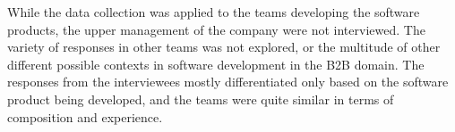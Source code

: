 \documentclass[english, grading]{tktltiki2}
\theoremstyle{definition}
\theoremstyle{remark}
\begin{document}
While the data collection was applied to the teams developing the software products, the upper management of the company were not interviewed. The variety of responses in other teams was not explored, or the multitude of other different possible contexts in software development in the B2B domain. The responses from the interviewees mostly differentiated only based on the software product being developed, and the teams were quite similar in terms of composition and experience.








%
%







\end{document}
